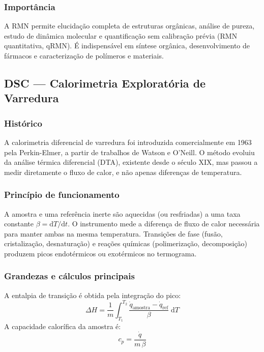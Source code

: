 \subsubsection*{Importância}

A RMN permite elucidação completa de estruturas orgânicas, análise de
pureza, estudo de dinâmica molecular e quantificação sem calibração
prévia (RMN quantitativa, qRMN). É indispensável em síntese orgânica,
desenvolvimento de fármacos e caracterização de polímeros e materiais.

\subsection{DSC --- Calorimetria Exploratória de Varredura}

\subsubsection*{Histórico}

A calorimetria diferencial de varredura foi introduzida comercialmente em
1963 pela Perkin-Elmer, a partir de trabalhos de Watson e O'Neill. O
método evoluiu da análise térmica diferencial (DTA), existente desde o
século XIX, mas passou a medir diretamente o fluxo de calor, e não apenas
diferenças de temperatura.

\subsubsection*{Princípio de funcionamento}

A amostra e uma referência inerte são aquecidas (ou resfriadas) a uma taxa
constante $\beta = \mathrm{d}T/\mathrm{d}t$. O instrumento mede a
diferença de fluxo de calor necessária para manter ambas na mesma
temperatura. Transições de fase (fusão, cristalização, desnaturação) e
reações químicas (polimerização, decomposição) produzem picos endotérmicos
ou exotérmicos no termograma.

\subsubsection*{Grandezas e cálculos principais}

A entalpia de transição é obtida pela integração do pico:
\begin{equation}
    \Delta H = \frac{1}{m} \int_{T_1}^{T_2}
               \frac{\dot{q}_{\text{amostra}} - \dot{q}_{\text{ref}}}{\beta}\;\mathrm{d}T
\end{equation}
A capacidade calorífica da amostra é:
\begin{equation}
    c_p = \frac{\dot{q}}{m\,\beta}
\end{equation}

